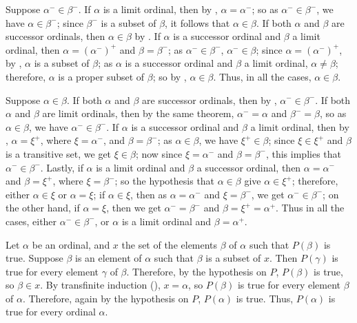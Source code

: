 \documentclass{article}
\begin{document}
\begin{solution}[\ref{exe:7tvca54w}]
  \label{sol:45jmdyf7}
  Suppose \(\alpha^- \in \beta^-\).  If \(\alpha\) is a limit ordinal,
  then by , \(\alpha = \alpha^-\); so as
  \(\alpha^- \in \beta^-\), we have \(\alpha \in \beta^-\); since
  \(\beta^-\) is a subset of \(\beta\), it follows that
  \(\alpha \in \beta\).  If both \(\alpha\) and \(\beta\) are
  successor ordinals, then \(\alpha \in \beta\) by
  .  If \(\alpha\) is a successor ordinal and
  \(\beta\) a limit ordinal, then \(\alpha = (\alpha^-)^+\) and
  \(\beta = \beta^-\); as \(\alpha^- \in \beta^-\),
  \(\alpha^- \in \beta\); since \(\alpha = (\alpha^-)^+\), by
  , \(\alpha\) is a subset of \(\beta\); as
  \(\alpha\) is a successor ordinal and \(\beta\) a limit ordinal,
  \(\alpha \neq \beta\); therefore, \(\alpha\) is a proper subset of
  \(\beta\); so by , \(\alpha \in \beta\).  Thus,
  in all the cases, \(\alpha \in \beta\).

  Suppose \(\alpha \in \beta\).  If both \(\alpha\) and \(\beta\) are
  successor ordinals, then by ,
  \(\alpha^- \in \beta^-\).  If both \(\alpha\) and \(\beta\) are
  limit ordinals, then by the same theorem, \(\alpha^- = \alpha\) and
  \(\beta^- = \beta\), so as \(\alpha \in \beta\), we have
  \(\alpha^- \in \beta^-\).  If \(\alpha\) is a successor ordinal and
  \(\beta\) a limit ordinal, then by ,
  \(\alpha = \xi^+\), where \(\xi = \alpha^-\), and
  \(\beta = \beta^-\); as \(\alpha \in \beta\), we have
  \(\xi^+ \in \beta\); since \(\xi \in \xi^+\) and \(\beta\) is a
  transitive set, we get \(\xi \in \beta\); now since
  \(\xi = \alpha^-\) and \(\beta = \beta^-\), this implies that
  \(\alpha^- \in \beta^-\).  Lastly, if \(\alpha\) is a limit ordinal
  and \(\beta\) a successor ordinal, then \(\alpha = \alpha^-\) and
  \(\beta = \xi^+\), where \(\xi = \beta^-\); so the hypothesis that
  \(\alpha \in \beta\) give \(\alpha \in \xi^+\); therefore, either
  \(\alpha \in \xi\) or \(\alpha = \xi\); if \(\alpha \in \xi\), then
  as \(\alpha = \alpha^-\) and \(\xi = \beta^-\), we get
  \(\alpha^- \in \beta^-\); on the other hand, if \(\alpha = \xi\),
  then we get \(\alpha^- = \beta^-\) and \(\beta = \xi^+ = \alpha^+\).
  Thus in all the cases, either \(\alpha^- \in \beta^-\), or
  \(\alpha\) is a limit ordinal and \(\beta = \alpha^+\).
\end{solution}

\begin{solution}[\ref{exe:jxzsy88l}]
  \label{sol:y7n1wugx}
  Let \(\alpha\) be an ordinal, and \(x\) the set of the elements
  \(\beta\) of \(\alpha\) such that \(P(\beta)\) is true.  Suppose
  \(\beta\) is an element of \(\alpha\) such that \(\beta\) is a
  subset of \(x\).  Then \(P(\gamma)\) is true for every element
  \(\gamma\) of \(\beta\).  Therefore, by the hypothesis on \(P\),
  \(P(\beta)\) is true, so \(\beta \in x\).  By transfinite induction
  (), \(x = \alpha\), so \(P(\beta)\) is true for
  every element \(\beta\) of \(\alpha\).  Therefore, again by the
  hypothesis on \(P\), \(P(\alpha)\) is true.  Thus, \(P(\alpha)\) is
  true for every ordinal \(\alpha\).
\end{solution}
\end{document}
